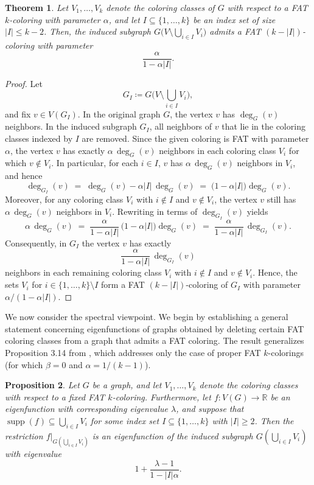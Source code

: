 \documentclass{article}
\newcommand{\R}{\mathbb{R}}
\DeclareMathOperator{\supp}{supp}
\theoremstyle{plain}
\newtheorem{theorem}{Theorem}[section]
\newtheorem{proposition}[theorem]{Proposition}
\theoremstyle{definition}
\theoremstyle{remark}
\begin{document}
\begin{theorem}\label{thm:removing}
    Let $V_1,\ldots,V_k$ denote the coloring classes of $G$ with respect to a FAT $k$-coloring with parameter $\alpha$, and let $I\subseteq \{1,\ldots,k\}$ be an index set of size $\lvert I\rvert\leq k-2$. Then, the induced subgraph $G\bigl(V\setminus\bigcup_{i\in I}V_i\bigr)$ admits a FAT $(k-\lvert I\rvert)$-coloring with parameter
    \[
        \frac{\alpha}{1-\alpha\lvert I\rvert}.
    \]
\end{theorem}
\begin{proof}
    Let \[
        G_{I}\coloneqq G\bigl(V\setminus\bigcup_{i\in I}V_i\bigr),
    \] and fix $v\in V(G_I)$.
    In the original graph $G$, the vertex $v$ has $\deg_G(v)$ neighbors. In the induced subgraph $G_I$, all neighbors of $v$ that lie in the coloring classes indexed by $I$ are removed. Since the given coloring is FAT with parameter $\alpha$, the vertex $v$ has exactly $\alpha\,\deg_G(v)$ neighbors in each coloring class $V_i$ for which $v\notin V_i$. In particular, for each $i\in I$, $v$ has $\alpha\,\deg_G(v)$ neighbors in $V_i$, and hence
    \[
        \deg_{G_I}(v)
        \;=\;
        \deg_G(v) - \alpha\lvert I\rvert\,\deg_G(v)
        \;=\;
        \bigl(1-\alpha\lvert I\rvert\bigr)\deg_G(v).
    \]
    Moreover, for any coloring class $V_i$ with $i\notin I$ and $v\notin V_i$, the vertex $v$ still has $\alpha\,\deg_G(v)$ neighbors in $V_i$. Rewriting in terms of $\deg_{G_I}(v)$ yields
    \[
        \alpha\,\deg_G(v)
        \;=\;
        \frac{\alpha}{1-\alpha\lvert I\rvert}\,\bigl(1-\alpha\lvert I\rvert\bigr)\deg_G(v)
        \;=\;
        \frac{\alpha}{1-\alpha\lvert I\rvert}\,\deg_{G_I}(v).
    \]
    Consequently, in $G_I$ the vertex $v$ has exactly
    \[
        \frac{\alpha}{1-\alpha\lvert I\rvert}\,\deg_{G_I}(v)
    \]
    neighbors in each remaining coloring class $V_i$ with $i\notin I$ and $v\notin V_i$. Hence, the sets $V_i$ for $i\in \{1,\ldots,k\}\setminus I$ form a FAT $(k-\lvert I\rvert)$-coloring of $G_I$ with parameter $\alpha/(1-\alpha\lvert I\rvert)$.
\end{proof}
We now consider the spectral viewpoint. We begin by establishing a general statement concerning eigenfunctions of graphs obtained by deleting certain FAT coloring classes from a graph that admits a FAT coloring. The result generalizes Proposition 3.14 from \cite{beersmulas2024}, which addresses only the case of proper FAT $k$-colorings (for which $\beta = 0$ and $\alpha = 1/(k-1)$).

\begin{proposition}\label{prop:removingef}
    Let $G$ be a graph, and let $V_1,\ldots,V_k$ denote the coloring classes with respect to a fixed FAT $k$-coloring.
    Furthermore, let $f\colon V(G)\to \R$ be an eigenfunction with corresponding eigenvalue $\lambda$, and suppose that $\supp(f)\subseteq \bigcup_{i\in I}V_i$ for some index set $I\subseteq \{1,\ldots,k\}$ with $|I|\geq 2$. Then the restriction $f|_{G\left(\bigcup_{i\in I}V_i\right)}$ is an eigenfunction of the induced subgraph $G\left(\bigcup_{i\in I}V_i\right)$ with eigenvalue
    \[
        1+\frac{\lambda-1}{1-|I|\alpha}.
    \]
\end{proposition}
\end{document}
